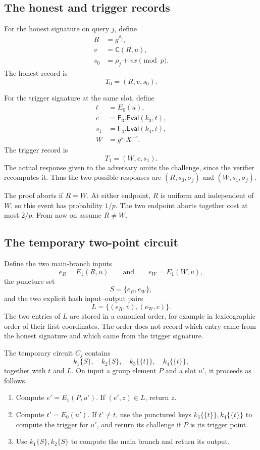 \documentclass[11pt]{article}
\newcommand{\Eval}{\mathsf{Eval}}
\begin{document}
\subsection{The honest and trigger records}

For the honest signature on query \(j\), define
\[
\begin{aligned}
  R&=g^{\rho_j},\\
  v&=\mathsf{C}(R,u),\\
  s_0&=\rho_j+vx\pmod p.
\end{aligned}
\]
The honest record is
\[
  T_0=(R,v,s_0).
\]

For the trigger signature at the same slot, define
\[
\begin{aligned}
  t&=E_0(u),\\
  c&=\mathsf{F}_3.\Eval(k_3,t),\\
  s_1&=\mathsf{F}_4.\Eval(k_4,t),\\
  W&=g^{s_1}X^{-c}.
\end{aligned}
\]
The trigger record is
\[
  T_1=(W,c,s_1).
\]
The actual response given to the adversary omits the challenge, since the
verifier recomputes it.  Thus the two possible responses are
\((R,s_0,\sigma_j)\) and \((W,s_1,\sigma_j)\).

The proof aborts if \(R=W\).  At either endpoint, \(R\) is uniform and
independent of \(W\), so this event has probability \(1/p\).  The two
endpoint aborts together cost at most \(2/p\).  From now on assume \(R\ne W\).

\subsection{The temporary two-point circuit}

Define the two main-branch inputs
\[
  e_R=E_1(R,u)
  \qquad\text{and}\qquad
  e_W=E_1(W,u),
\]
the puncture set
\[
  S=\{e_R,e_W\},
\]
and the two explicit hash input--output pairs
\[
  L=\{(e_R,v),(e_W,c)\}.
\]
The two entries of \(L\) are stored in a canonical order, for example in
lexicographic order of their first coordinates.  The order does not record
which entry came from the honest signature and which came from the trigger
signature.

The temporary circuit \(C_j\) contains
\[
  k_1\{S\},\quad k_2\{S\},\quad
  k_3\{\{t\}\},\quad k_4\{\{t\}\},
\]
together with \(t\) and \(L\).  On input a group element \(P\) and a slot
\(u'\), it proceeds as follows.

\begin{enumerate}[leftmargin=2em]
\item Compute \(e'=E_1(P,u')\).  If \((e',z)\in L\), return \(z\).
\item Compute \(t'=E_0(u')\).  If \(t'\ne t\), use the punctured keys
      \(k_3\{\{t\}\},k_4\{\{t\}\}\) to compute the trigger for \(u'\), and
      return its challenge if \(P\) is its trigger point.
\item Use \(k_1\{S\},k_2\{S\}\) to compute the main branch and return its
      output.
\end{enumerate}
\end{document}
